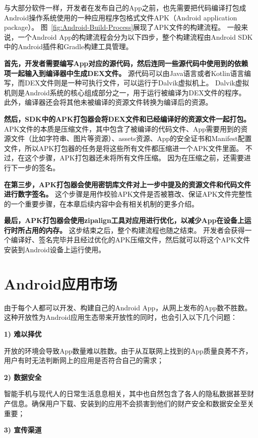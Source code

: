 与大部分软件一样，开发者在发布自己的App之前，也先需要把代码编译打包成Android操作系统使用的一种应用程序包格式文件APK（Android application package）。
图~\ref{fig:Android-Build-Process}展现了APK文件的构建流程。
一般来说，一个Android App的构建流程会分为以下四步，整个构建流程由Android SDK中的Android插件和Gradle构建工具管理。

\textbf{首先，开发者需要编写App对应的源代码，然后连同一些源代码中使用到的依赖项一起输入到编译器中生成DEX文件。}
源代码可以由Java语言或者Kotlin语言编写，而DEX文件则是一种可执行文件，可以运行于Dalvik虚拟机上。
Dalvik虚拟机则是Android系统的核心组成部分之一，用于运行被编译为DEX文件的程序。
此外，编译器还会将其他未被编译的资源文件转换为编译后的资源。

\textbf{然后，SDK中的APK打包器会将DEX文件和已经编译好的资源文件一起打包。}
APK文件的本质是压缩文件，其中包含了被编译的代码文件、App需要用到的资源文件（比如字符串、图片等资源）、assets资源、App的安全证书和Manifest配置文件，所以APK打包器的任务是将这些所有文件都压缩进一个APK文件里面。
不过，在这个步骤，APK打包器还未将所有文件压缩。
因为在压缩之前，还需要进行下一步的签名。

\textbf{在第三步，APK打包器会使用密钥库文件对上一步中提及的资源文件和代码文件进行数字签名。}
这个步骤是用作校验APK文件是否被篡改、保证APK文件完整性的一个重要步骤，在本章后续内容中会有相关机制的更多介绍。

\textbf{最后，APK打包器会使用zipalign工具对应用进行优化，以减少App在设备上运行时所占用的内存。}
这步结束之后，整个构建流程也随之结束。
开发者会获得一个编译好、签名完毕并且经过优化的APK压缩文件，然后就可以将这个APK文件安装到Android设备上运行使用。


\section{Android应用市场}
由于每个人都可以开发、构建自己的Android App，从网上发布的App数不胜数。这种开放性为Android应用生态带来开放性的同时，也会引入以下几个问题：

\textbf{1) 难以择优}

开放的环境会导致App数量难以胜数。由于从互联网上找到的App质量良莠不齐，用户有时无法判断网上的应用是否符合自己的需求；

\textbf{2) 数据安全}

智能手机与现代人的日常生活息息相关，其中也自然包含了各人的隐私数据甚至财产信息。确保用户下载、安装到的应用不会损害到他们的财产安全和数据安全至关重要；

\textbf{3) 宣传渠道}

